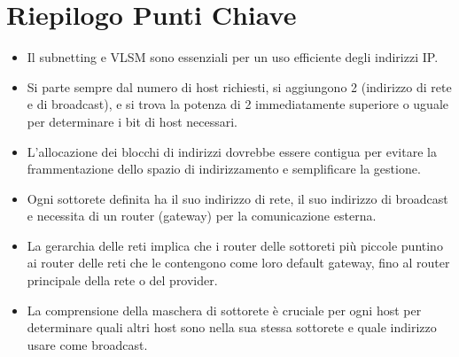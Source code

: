 \documentclass{article}
\begin{document}
\newpage
\section{Riepilogo Punti Chiave}
\begin{itemize}
    \item Il subnetting e VLSM sono essenziali per un uso efficiente degli indirizzi IP.
    \item Si parte sempre dal numero di host richiesti, si aggiungono 2 (indirizzo di rete e di broadcast), e si trova la potenza di 2 immediatamente superiore o uguale per determinare i bit di host necessari.
    \item L'allocazione dei blocchi di indirizzi dovrebbe essere contigua per evitare la frammentazione dello spazio di indirizzamento e semplificare la gestione.
    \item Ogni sottorete definita ha il suo indirizzo di rete, il suo indirizzo di broadcast e necessita di un router (gateway) per la comunicazione esterna.
    \item La gerarchia delle reti implica che i router delle sottoreti più piccole puntino ai router delle reti che le contengono come loro default gateway, fino al router principale della rete o del provider.
    \item La comprensione della maschera di sottorete è cruciale per ogni host per determinare quali altri host sono nella sua stessa sottorete e quale indirizzo usare come broadcast.
\end{itemize}
\end{document}
